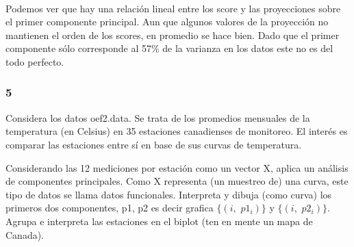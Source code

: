 \documentclass[11pt]{article}
\begin{document}
    \begin{center}
    \end{center}
    { \hspace*{\fill} \\}
    
    Podemos ver que hay una relación lineal entre los score y las
proyecciones sobre el primer componente principal. Aun que algunos
valores de la proyección no mantienen el orden de los scores, en
promedio se hace bien. Dado que el primer componente sólo corresponde al
57\% de la varianza en los datos este no es del todo perfecto.

    \subsubsection{5}\label{section}

Considera los datos oef2.data. Se trata de los promedios mensuales de la
temperatura (en Celsius) en 35 estaciones canadienses de monitoreo. El
interés es comparar las estaciones entre sí en base de sus curvas de
temperatura.

Considerando las 12 mediciones por estación como un vector X, aplica un
análisis de componentes principales. Como X representa (un muestreo de)
una curva, este tipo de datos se llama datos funcionales. Interpreta y
dibuja (como curva) los primeros dos componentes, p1, p2 es decir
grafica \(\{(i, \,\,p1_i)\}\) y \(\{(i, \,\,p2_i)\}\). Agrupa e
interpreta las estaciones en el biplot (ten en mente un mapa de Canada).


    
    
    
    
\end{document}
